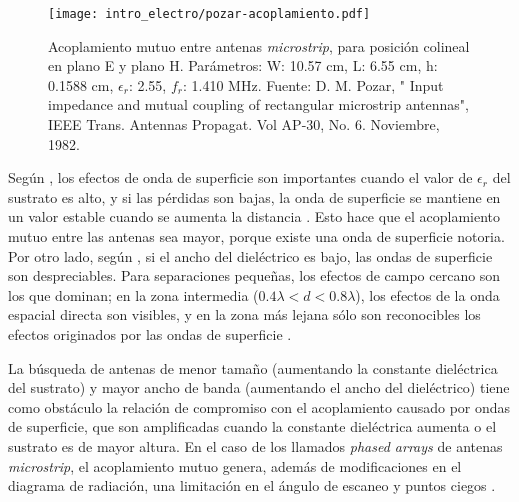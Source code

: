 \begin{figure}[htp]
	\centering
	\texttt{[image: intro\_electro/pozar-acoplamiento.pdf]}
	\caption{Acoplamiento mutuo entre antenas \textit{microstrip}, para posición colineal en plano E y plano H. Parámetros: W: 10.57 cm, L: 6.55 cm, h: 0.1588 cm, $\epsilon_r$: 2.55, $f_r$: 1.410 MHz. Fuente: D. M. Pozar, " Input impedance and mutual coupling of rectangular microstrip antennas", IEEE Trans. Antennas Propagat. Vol AP-30, No. 6. Noviembre, 1982.}
	\label{fig:acomplamientoEyH}
\end{figure}

Según \cite{Dodov:SurfaceWavesImpact}, los efectos de onda de superficie son importantes cuando el valor de $\epsilon_r$ del sustrato es alto, y si las pérdidas son bajas, la onda de superficie se mantiene en un valor estable cuando se aumenta la distancia \cite{Gonzalo:PerformancePBG}. Esto hace que el acoplamiento mutuo entre las antenas sea mayor, porque existe una onda de superficie notoria. Por otro lado, según \cite{Penard:MutualCouplingMicrostrip}, si el ancho del dieléctrico es bajo, las ondas de superficie son despreciables. Para separaciones pequeñas, los efectos de campo cercano son los que dominan; en la zona intermedia ($0.4\lambda  < d <  0.8 \lambda$), los efectos de la onda espacial directa son visibles, y en la zona más lejana sólo son reconocibles los efectos originados por las ondas de superficie \cite{Alexopoulos:PrintedDipoles}.

La búsqueda de antenas de menor tamaño (aumentando la constante dieléctrica del sustrato) y mayor ancho de banda (aumentando el ancho del dieléctrico) tiene como obstáculo la relación de compromiso con el acoplamiento causado por ondas de superficie, que son amplificadas cuando la constante dieléctrica aumenta o el sustrato es de mayor altura. En el caso de los llamados \textit{phased arrays} de antenas \textit{microstrip}, el acoplamiento mutuo genera, además de modificaciones en el diagrama de radiación, una limitación en el ángulo de escaneo y puntos ciegos \cite{Iluz:PhasedArray}.



